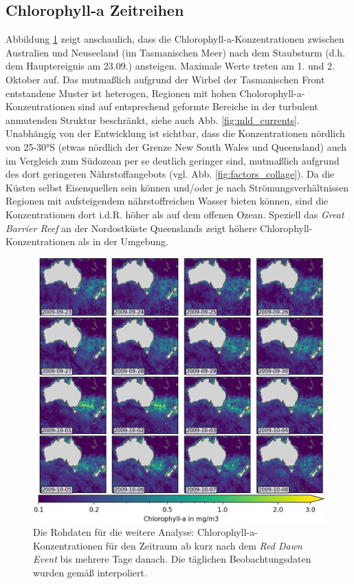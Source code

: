 \documentclass[12pt,a4paper,onecolumn,headheight=30pt]{scrartcl}
\begin{document}
\subsection{Chlorophyll-a Zeitreihen} \label{sec:chla_zeitreihen}
\sloppy 
Abbildung \ref{fig:chla_collage} zeigt anschaulich, dass die Chlorophyll-a-Konzentrationen zwischen Australien und Neuseeland (im Tasmanischen Meer) nach dem Staubsturm (d.h. dem Hauptereignis am 23.09.) ansteigen. Maximale Werte treten am 1. und 2. Oktober auf. Das mutmaßlich aufgrund der Wirbel der Tasmanischen Front \citep{Tilburg.2002} entstandene Muster ist heterogen, Regionen mit hohen Cholorophyll-a-Konzentrationen sind auf entsprechend geformte Bereiche in der turbulent anmutenden Struktur beschränkt, siehe auch Abb. \ref{fig:mld_currents}. Unabhängig von der Entwicklung ist sichtbar, dass die Konzentrationen nördlich von 25-30°S (etwas nördlich der Grenze New South Wales und Queensland) auch im Vergleich zum Südozean per se deutlich geringer sind, mutmaßlich aufgrund des dort geringeren Nährstoffangebots (vgl. Abb. \ref{fig:factors_collage}). Da die Küsten selbst Eisenquellen sein können und/oder je nach Strömungsverhältnissen Regionen mit aufsteigendem nährstoffreichen Wasser bieten können, sind die Konzentrationen dort i.d.R. höher als auf dem offenen Ozean. Speziell das \textit{Great Barrier Reef} an der Nordostküste Queenslands zeigt höhere Chlorophyll-Konzentrationen als in der Umgebung. 
\begin{figure}[htbp]
\includegraphics[width=\textwidth]{bilder/chl_collage.png}
\caption{Die Rohdaten für die weitere Analyse: Chlorophyll-a-Konzentrationen für den Zeitraum ab kurz nach dem \textit{Red Dawn Event} bis mehrere Tage danach. Die täglichen Beobachtungsdaten wurden gemäß \cite{Saulquin.2019} interpoliert.} \label{fig:chla_collage}
\end{figure}
\end{document}
